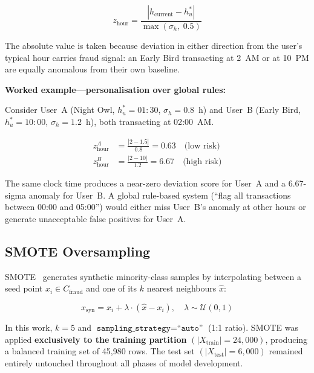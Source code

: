 \documentclass[conference]{IEEEtran}
\begin{document}
\begin{equation}
    z_{\text{hour}} = \frac{|h_{\text{current}} - h_u^*|}{\max(\sigma_h,\ 0.5)}
    \label{eq:hour_deviation}
\end{equation}

The absolute value is taken because deviation in either direction from
the user's typical hour carries fraud signal: an Early Bird transacting at
2~AM or at 10~PM are equally anomalous from their own baseline.

\textbf{Worked example---personalisation over global rules:}

Consider User~A (Night Owl, $h_u^* = 01{:}30$, $\sigma_h = 0.8$~h) and
User~B (Early Bird, $h_u^* = 10{:}00$, $\sigma_h = 1.2$~h), both
transacting at 02{:}00~AM.

\begin{align}
    z_{\text{hour}}^{A} &= \frac{|2 - 1.5|}{0.8} = 0.63 \quad \text{(low risk)} \\
    z_{\text{hour}}^{B} &= \frac{|2 - 10|}{1.2}  = 6.67 \quad \text{(high risk)}
\end{align}

The same clock time produces a near-zero deviation score for User~A and
a 6.67-sigma anomaly for User~B. A global rule-based system (``flag all
transactions between 00:00 and 05:00'') would either miss User~B's
anomaly at other hours or generate unacceptable false positives for User~A.

\subsection{SMOTE Oversampling}

SMOTE~\cite{smote2002} generates synthetic minority-class samples by
interpolating between a seed point $x_i \in C_{\text{fraud}}$ and one of
its $k$ nearest neighbours $\hat{x}$:

\begin{equation}
    x_{\text{syn}} = x_i + \lambda \cdot (\hat{x} - x_i), \quad \lambda \sim \mathcal{U}(0,1)
    \label{eq:smote}
\end{equation}

In this work, $k = 5$ and
$\texttt{sampling\_strategy} = \texttt{``auto''}$ (1:1 ratio).
SMOTE was applied \textbf{exclusively to the training partition}
$(|X_{\text{train}}| = 24{,}000)$, producing a balanced training set
of 45{,}980 rows. The test set $(|X_{\text{test}}| = 6{,}000)$ remained
entirely untouched throughout all phases of model development.
\end{document}
